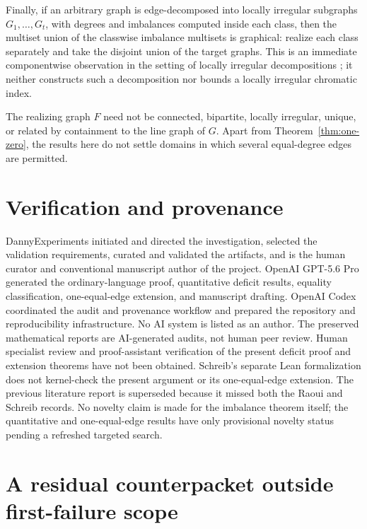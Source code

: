 \documentclass[a4paper,11pt]{amsart}
\numberwithin{equation}{section}
\theoremstyle{definition}
\theoremstyle{remark}
\begin{document}
Finally, if an arbitrary graph is edge-decomposed into locally irregular subgraphs $G_1,\ldots,G_t$, with degrees and imbalances computed inside each class, then the multiset union of the classwise imbalance multisets is graphical: realize each class separately and take the disjoint union of the target graphs.  This is an immediate componentwise observation in the setting of locally irregular decompositions \cite{BensmailStevens2016}; it neither constructs such a decomposition nor bounds a locally irregular chromatic index.

The realizing graph $F$ need not be connected, bipartite, locally irregular, unique, or related by containment to the line graph of $G$.  Apart from Theorem~\ref{thm:one-zero}, the results here do not settle domains in which several equal-degree edges are permitted.

\section*{Verification and provenance}

DannyExperiments initiated and directed the investigation, selected the validation requirements, curated and validated the artifacts, and is the human curator and conventional manuscript author of the project.  OpenAI GPT-5.6 Pro generated the ordinary-language proof, quantitative deficit results, equality classification, one-equal-edge extension, and manuscript drafting.  OpenAI Codex coordinated the audit and provenance workflow and prepared the repository and reproducibility infrastructure.  No AI system is listed as an author.  The preserved mathematical reports are AI-generated audits, not human peer review.  Human specialist review and proof-assistant verification of the present deficit proof and extension theorems have not been obtained.  Schreib's separate Lean formalization \cite{Schreib2026} does not kernel-check the present argument or its one-equal-edge extension.  The previous literature report is superseded because it missed both the Raoui and Schreib records.  No novelty claim is made for the imbalance theorem itself; the quantitative and one-equal-edge results have only provisional novelty status pending a refreshed targeted search.

\appendix

\section{A residual counterpacket outside first-failure scope}\label{app:counterpacket}
\end{document}
